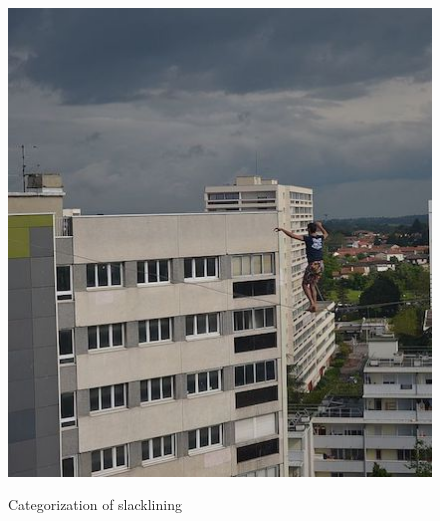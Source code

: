 \begin{figure}[htb]
\begin{minipage}[t]{0.45\linewidth}
		\includegraphics[width=1\linewidth]{Pictures/3_1_urbanline}
		\label{fig:urbanline}
	\end{minipage}
	\caption{Categorization of slacklining}
	\label{fig:slacklineCategorization}
\end{figure}

